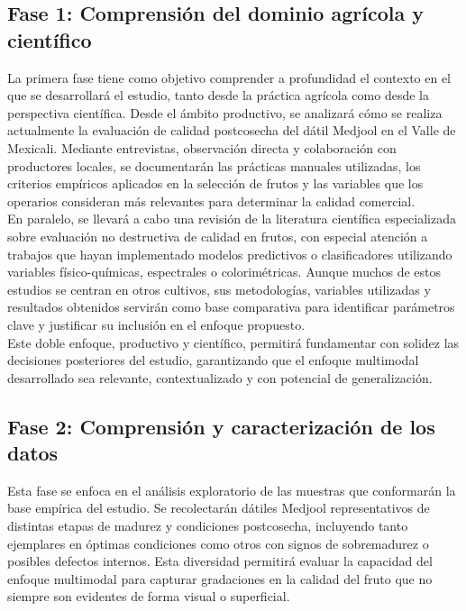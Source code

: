 \subsection{Fase 1: Comprensión del dominio agrícola y científico}

La primera fase tiene como objetivo comprender a profundidad el contexto en el que se desarrollará el estudio, tanto desde la práctica agrícola como desde la perspectiva científica. Desde el ámbito productivo, se analizará cómo se realiza actualmente la evaluación de calidad postcosecha del dátil Medjool en el Valle de Mexicali. Mediante entrevistas, observación directa y colaboración con productores locales, se documentarán las prácticas manuales utilizadas, los criterios empíricos aplicados en la selección de frutos y las variables que los operarios consideran más relevantes para determinar la calidad comercial.\\

En paralelo, se llevará a cabo una revisión de la literatura científica especializada sobre evaluación no destructiva de calidad en frutos, con especial atención a trabajos que hayan implementado modelos predictivos o clasificadores utilizando variables físico-químicas, espectrales o colorimétricas. Aunque muchos de estos estudios se centran en otros cultivos, sus metodologías, variables utilizadas y resultados obtenidos servirán como base comparativa para identificar parámetros clave y justificar su inclusión en el enfoque propuesto.\\

Este doble enfoque, productivo y científico, permitirá fundamentar con solidez las decisiones posteriores del estudio, garantizando que el enfoque multimodal desarrollado sea relevante, contextualizado y con potencial de generalización.

\subsection{Fase 2: Comprensión y caracterización de los datos}

Esta fase se enfoca en el análisis exploratorio de las muestras que conformarán la base empírica del estudio. Se recolectarán dátiles Medjool representativos de distintas etapas de madurez y condiciones postcosecha, incluyendo tanto ejemplares en óptimas condiciones como otros con signos de sobremadurez o posibles defectos internos. Esta diversidad permitirá evaluar la capacidad del enfoque multimodal para capturar gradaciones en la calidad del fruto que no siempre son evidentes de forma visual o superficial.\\

